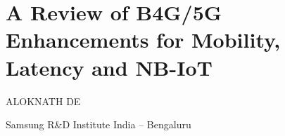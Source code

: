 \chapter{A Review of B4G/5G Enhancements for Mobility, Latency and NB-I\lowercase{o}T}

\begin{center}
{\large\uppercase{Aloknath De}} 

Samsung R\&D Institute India – Bengaluru

\vskip -6pt

\end{center}

\vskip 2cm




\vfill




\newpage

